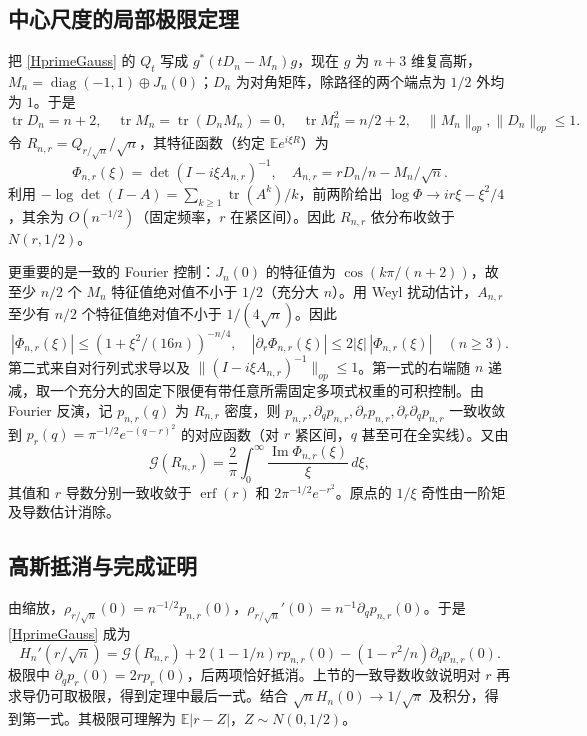 \documentclass[11pt,a4paper,fontset=fandol]{ctexart}
\newcommand{\E}{\mathbb E}
\newcommand{\tr}{\operatorname{tr}}
\newcommand{\diag}{\operatorname{diag}}
\newcommand{\G}{\mathcal G}
\theoremstyle{remark}\newtheorem{conjecture}{猜想}
\begin{document}
\subsection{中心尺度的局部极限定理}
把 \eqref{HprimeGauss} 的 $Q_t$ 写成 $g^*(tD_n-M_n)g$，现在 $g$ 为 $n+3$ 维复高斯，$M_n=\diag(-1,1)\oplus J_n(0)$；$D_n$ 为对角矩阵，除路径的两个端点为 $1/2$ 外均为 $1$。于是
\[
 \tr D_n=n+2,\quad\tr M_n=\tr(D_nM_n)=0,\quad\tr M_n^2=n/2+2,
 \quad \|M_n\|_{op},\|D_n\|_{op}\le1.
\]
令 $R_{n,r}=Q_{r/\sqrt n}/\sqrt n$，其特征函数（约定 $\E e^{i\xi R}$）为
\begin{equation}\label{phi}
 \Phi_{n,r}(\xi)=\det(I-i\xi A_{n,r})^{-1},\quad A_{n,r}=rD_n/n-M_n/\sqrt n.
\end{equation}
利用 $-\log\det(I-A)=\sum_{k\ge1}\tr(A^k)/k$，前两阶给出 $\log\Phi\to ir\xi-\xi^2/4$，其余为 $O(n^{-1/2})$（固定频率，$r$ 在紧区间）。因此 $R_{n,r}$ 依分布收敛于 $N(r,1/2)$。

更重要的是一致的 Fourier 控制：$J_n(0)$ 的特征值为 $\cos(k\pi/(n+2))$，故至少 $n/2$ 个 $M_n$ 特征值绝对值不小于 $1/2$（充分大 $n$）。用 Weyl 扰动估计，$A_{n,r}$ 至少有 $n/2$ 个特征值绝对值不小于 $1/(4\sqrt n)$。因此
\begin{equation}\label{tail}
 |\Phi_{n,r}(\xi)|\le(1+\xi^2/(16n))^{-n/4},\quad
 |\partial_r\Phi_{n,r}(\xi)|\le2|\xi|\,|\Phi_{n,r}(\xi)|\quad(n\ge3).
\end{equation}
第二式来自对行列式求导以及 $\|(I-i\xi A_{n,r})^{-1}\|_{op}\le1$。第一式的右端随 $n$ 递减，取一个充分大的固定下限便有带任意所需固定多项式权重的可积控制。由 Fourier 反演，记 $p_{n,r}(q)$ 为 $R_{n,r}$ 密度，则 $p_{n,r},\partial_qp_{n,r},\partial_rp_{n,r},\partial_r\partial_qp_{n,r}$ 一致收敛到 $p_r(q)=\pi^{-1/2}e^{-(q-r)^2}$ 的对应函数（对 $r$ 紧区间，$q$ 甚至可在全实线）。又由
\[
 \G(R_{n,r})=\frac2\pi\int_0^\infty\frac{\operatorname{Im}\Phi_{n,r}(\xi)}{\xi}\,d\xi,
\]
其值和 $r$ 导数分别一致收敛于 $\operatorname{erf}(r)$ 和 $2\pi^{-1/2}e^{-r^2}$。原点的 $1/\xi$ 奇性由一阶矩及导数估计消除。

\subsection{高斯抵消与完成证明}
由缩放，$\rho_{r/\sqrt n}(0)=n^{-1/2}p_{n,r}(0)$，$\rho_{r/\sqrt n}'(0)=n^{-1}\partial_qp_{n,r}(0)$。于是 \eqref{HprimeGauss} 成为
\begin{equation}\label{rescale}
 H_n'(r/\sqrt n)=\G(R_{n,r})+2(1-1/n)r p_{n,r}(0)-(1-r^2/n)\partial_qp_{n,r}(0).
\end{equation}
极限中 $\partial_qp_r(0)=2rp_r(0)$，后两项恰好抵消。上节的一致导数收敛说明对 $r$ 再求导仍可取极限，得到定理中最后一式。结合 $\sqrt n H_n(0)\to1/\sqrt\pi$ 及积分，得到第一式。其极限可理解为 $\E|r-Z|$，$Z\sim N(0,1/2)$。
\end{document}
